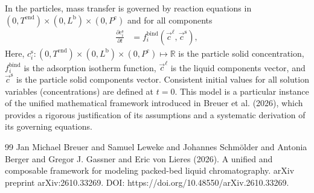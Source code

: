 \documentclass{article}
\begin{document}
In the particles, mass transfer is governed by reaction equations in $(0, T^{\mathrm{end}}) \times (0, L^{\mathrm{b}})\times (0, P^{\mathrm{c}})$ and for all components
\begin{align}
    \frac{\partial c^{\mathrm{s}}_{i}}{\partial t}
    &= f^{\mathrm{bind}}_{i}\left( \vec{c}^{\mathrm{\ell}}, \vec{c}^{\mathrm{s}} \right),
\end{align}
Here, $c^{\mathrm{s}}_{i}\colon (0, T^{\mathrm{end}}) \times (0, L^{\mathrm{b}})\times (0, P^{\mathrm{c}}) \mapsto \mathbb{R}$ is the particle solid concentration, $f^{\mathrm{bind}}_{i}$ is the adsorption isotherm function, $\vec{c}^{\mathrm{\ell}}$ is the liquid components vector, and $\vec{c}^{\mathrm{s}}$ is the particle solid components vector.
Consistent initial values for all solution variables (concentrations) are defined at $t = 0$.
This model is a particular instance of the unified mathematical framework introduced in Breuer et al. (2026), which provides a rigorous justification of its assumptions and a systematic derivation of its governing equations.
\begin{thebibliography}{99}
     Jan Michael Breuer and Samuel Leweke and Johannes Schmölder and Antonia Berger and Gregor J. Gassner and Eric von Lieres (2026). A unified and composable framework for modeling packed-bed liquid chromatography. arXiv preprint arXiv:2610.33269. DOI: https://doi.org/10.48550/arXiv.2610.33269.
\end{thebibliography}
\end{document}
